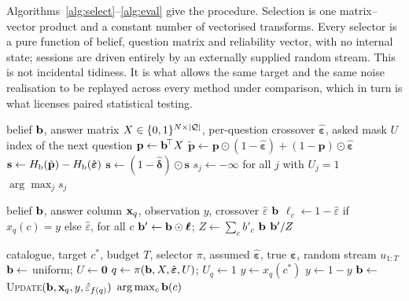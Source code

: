 Algorithms~\ref{alg:select}--\ref{alg:eval} give the procedure. Selection is
one matrix--vector product and a constant number of vectorised transforms.
Every selector is a pure function of belief, question matrix and reliability
vector, with no internal state; sessions are driven entirely by an externally
supplied random stream. This is not incidental tidiness. It is what allows the
same target and the same noise realisation to be replayed across every method
under comparison, which in turn is what licenses paired statistical testing.

\begin{algorithm}[t]
\caption{Reliability-aware query selection}
\label{alg:select}
\begin{algorithmic}[1]
\Require belief $\mathbf{b}$, answer matrix $X \in \{0,1\}^{N \times |\mathcal{Q}|}$,
per-question crossover $\hat{\boldsymbol\varepsilon}$, asked mask $U$
\Ensure index of the next question
\State $\mathbf{p} \gets \mathbf{b}^{\!\top} X$
\State $\tilde{\mathbf{p}} \gets \mathbf{p} \odot (1-\hat{\boldsymbol\varepsilon})
   + (1-\mathbf{p}) \odot \hat{\boldsymbol\varepsilon}$
\State $\mathbf{s} \gets H_{\mathrm{b}}(\tilde{\mathbf{p}}) - H_{\mathrm{b}}(\hat{\boldsymbol\varepsilon})$
  \State $\mathbf{s} \gets (1-\hat{\boldsymbol\delta}) \odot \mathbf{s}$
\EndIf
\State $s_j \gets -\infty$ for all $j$ with $U_j = 1$
\State \Return $\arg\max_j s_j$
\end{algorithmic}
\end{algorithm}

\begin{algorithm}[t]
\caption{Belief update under BSC$(\hat\varepsilon)$}
\label{alg:update}
\begin{algorithmic}[1]
\Require belief $\mathbf{b}$, answer column $\mathbf{x}_q$, observation $y$, crossover $\hat\varepsilon$
 \State \Return $\mathbf{b}$  \EndIf
\State $\ell_c \gets 1-\hat\varepsilon$ if $x_q(c)=y$ else $\hat\varepsilon$, for all $c$
\State $\mathbf{b}' \gets \mathbf{b} \odot \boldsymbol\ell$; \quad $Z \gets \sum_c b'_c$
 
  \State \Return $\mathbf{b}$ 
\EndIf
\State \Return $\mathbf{b}' / Z$
\end{algorithmic}
\end{algorithm}

\begin{algorithm}[t]
\caption{Identification session}
\label{alg:session}
\begin{algorithmic}[1]
\Require catalogue, target $c^\ast$, budget $T$, selector $\pi$,
assumed $\hat{\boldsymbol\varepsilon}$, true $\boldsymbol\varepsilon$,
random stream $u_{1:T}$
\State $\mathbf{b} \gets$ uniform; $U \gets \mathbf{0}$
  \State $q \gets \pi(\mathbf{b}, X, \hat{\boldsymbol\varepsilon}, U)$; $U_q \gets 1$
  \State $y \gets x_q(c^\ast)$
   $y \gets 1-y$  \EndIf
  \State $\mathbf{b} \gets$ \textsc{Update}$(\mathbf{b}, \mathbf{x}_q, y, \hat\varepsilon_{f(q)})$
\EndFor
\State \Return $\arg\max_c \mathbf{b}(c)$
\end{algorithmic}
\end{algorithm}

